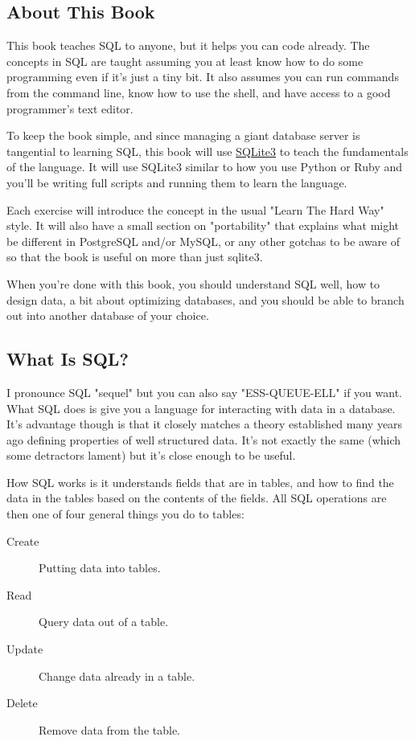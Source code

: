 \subsection*{About This Book}

This book teaches SQL to anyone, but it helps you can code already.  The 
concepts in SQL are taught assuming you at least know how to do some programming
even if it's just a tiny bit.  It also assumes you can run commands from the
command line, know how to use the shell, and have access to a good programmer's
text editor.

To keep the book simple, and since managing a giant database server is tangential
to learning SQL, this book will use \href{http://sqlite.org}{SQLite3} to teach
the fundamentals of the language.  It will use SQLite3 similar to how you use
Python or Ruby and you'll be writing full  scripts and running them
to learn the language.  

Each exercise will introduce the concept in the usual "Learn The Hard Way" style.
It will also have a small section on "portability" that explains what might be
different in PostgreSQL and/or MySQL, or any other gotchas to be aware of so that
the book is useful on more than just sqlite3.

When you're done with this book, you should understand SQL well, how to design
data, a bit about optimizing databases, and you should be able to branch out into
another database of your choice.

\subsection*{What Is SQL?}

I pronounce SQL "sequel" but you can also say "ESS-QUEUE-ELL" if you want. What SQL 
does is give you a language for interacting with data in a database.  It's advantage
though is that it closely matches a theory established many years ago defining properties
of well structured data.  It's not exactly the same (which some detractors lament) but
it's close enough to be useful.

How SQL works is it understands fields that are in tables, and how to find the
data in the tables based on the contents of the fields.  All SQL operations are
then one of four general things you do to tables:

\begin{description}
\item[Create] Putting data into tables.
\item[Read] Query data out of a table.
\item[Update] Change data already in a table.
\item[Delete] Remove data from the table.
\end{description}

